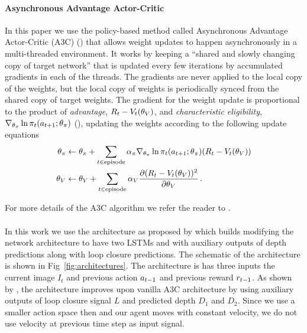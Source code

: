 \paragraph{Asynchronous Advantage Actor-Critic}
\def\charelig{\nabla_{\theta_\pi}\ln \pit(\acttn; \theta_\pi)}
In this paper we use the policy-based method called Asynchronous Advantage Actor-Critic (A3C) (\cite{MnBaMiICML2016}) that allows weight updates to happen asynchronously in a multi-threaded environment.
It works by keeping a ``shared and slowly changing copy of target network'' that is updated every few iterations by accumulated gradients in each of the threads.
The gradients are never applied to the local copy of the weights, but the local copy of weights is periodically synced from the shared copy of target weights.
The gradient for the weight update is proportional to the product of \emph{advantage}, $R_t - V_t(\theta_V)$, and \emph{characteristic eligibility}, $\charelig$ (\cite{WiML1992}), updating the weights according to the following update equations
\begin{align}
  \theta_\pi &\leftarrow \theta_\pi
  + \sum_{t \in \text{episode}}\alpha_\pi \charelig (R_t - \Value_t(\theta_\Value))
  \\
  \theta_\Value &\leftarrow \theta_\Value
  + \sum_{t \in \text{episode}} \alpha_\Value \frac{\partial (R_t - \Value_t(\theta_\Value))^2}
                  {\partial\theta_\Value}
                  \, .
\end{align}

For more details of the A3C algorithm we refer the reader to \cite{MnBaMiICML2016}.
\paragraph{\NavAiiiCDiDiiL{}}
In this work we use the \NavAiiiCDiDiiL{} architecture as proposed by \cite{MiPaViICLR2017} which builds modifying the network architecture to have two LSTMs and with auxiliary outputs of depth predictions along with loop closure predictions.
The schematic of the architecture is shown in Fig~\ref{fig:architectures}.
The architecture is has three inputs the current image $I_t$ and previous action $a_{t-1}$ and previous reward $r_{t-1}$.
As shown by \cite{MiPaViICLR2017}, the architecture improves upon vanilla A3C architecture by using auxiliary outputs of loop closure signal $L$ and predicted depth $D_1$ and $D_2$.
Since we use a smaller action space then \cite{MiPaViICLR2017} and our agent moves with constant velocity, we do not use velocity at previous time step as input signal.

